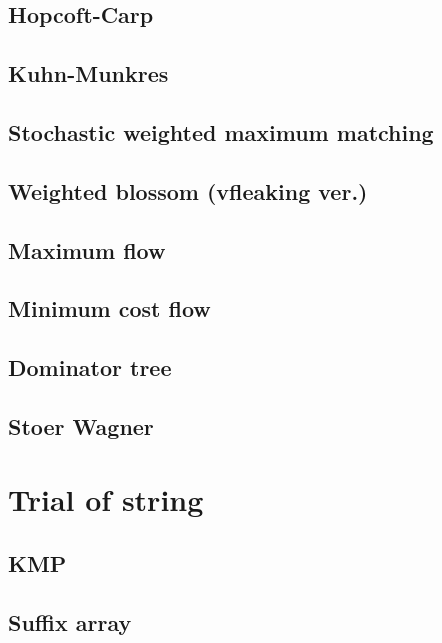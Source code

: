 \documentclass[UTF8,a4paper]{report}
\begin{document}
		\section{Hopcoft-Carp}
			
		\section{Kuhn-Munkres}
			
		\section{Stochastic weighted maximum matching}
			
		\section{Weighted blossom (vfleaking ver.)}	
			
		\section{Maximum flow}
			
		\section{Minimum cost flow}
			
		\section{Dominator tree}
			
		\section{Stoer Wagner}
			
	\chapter{Trial of string}
		\section{KMP}
			
		\section{Suffix array}
			
\end{document}
